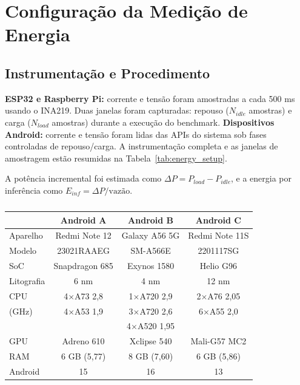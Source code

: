 \section{Configuração da Medição de Energia}

\subsection{Instrumentação e Procedimento}
\textbf{ESP32 e Raspberry Pi:} corrente e tensão foram amostradas a cada 500 ms usando o INA219. Duas janelas foram capturadas: repouso ($N_{idle}$ amostras) e carga ($N_{load}$ amostras) durante a execução do benchmark.\newline
\textbf{Dispositivos Android:} corrente e tensão foram lidas das APIs do sistema sob fases controladas de repouso/carga.
A instrumentação completa e as janelas de amostragem estão resumidas na Tabela~\ref{tab:energy_setup}.

A potência incremental foi estimada como $\Delta P = P_{load} - P_{idle}$, e a energia por inferência como $E_{inf} = \Delta P / \text{vazão}$.


\begin{table}[t]
\caption{}
\label{tab:android_specs}
\centering
\scriptsize
\setlength{\tabcolsep}{3pt}
\begin{tabular}{lccc}
\toprule
 & Android A & Android B & Android C \\
\midrule
Aparelho & Redmi Note 12 & Galaxy A56 5G & Redmi Note 11S \\
Modelo & 23021RAAEG & SM-A566E & 2201117SG \\
SoC & Snapdragon 685 & Exynos 1580 & Helio G96 \\
Litografia & 6 nm & 4 nm & 12 nm \\
CPU & 4$\times$A73 2,8 & 1$\times$A720 2,9 & 2$\times$A76 2,05 \\
(GHz) & 4$\times$A53 1,9 & 3$\times$A720 2,6 & 6$\times$A55 2,0 \\
 & & 4$\times$A520 1,95 & \\
GPU & Adreno 610 & Xclipse 540 & Mali-G57 MC2 \\
RAM & 6 GB (5,77) & 8 GB (7,60) & 6 GB (5,86) \\
Android & 15 & 16 & 13 \\
\bottomrule
\end{tabular}
\end{table}

